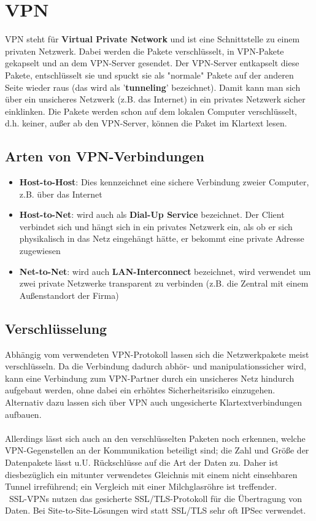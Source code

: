 \chapter{VPN}

VPN steht für \textbf{Virtual Private Network} und ist eine Schnittstelle zu einem privaten Netzwerk. Dabei werden die Pakete verschlüsselt, in VPN-Pakete gekapselt und an dem VPN-Server gesendet. Der VPN-Server entkapselt diese Pakete, entschlüsselt sie und spuckt sie als "normale" Pakete auf der anderen Seite wieder raus (das wird als '\textbf{tunneling}' bezeichnet). Damit kann man sich über ein unsicheres Netzwerk (z.B. das Internet) in ein privates Netzwerk sicher einklinken. Die Pakete werden schon auf dem lokalen Computer verschlüsselt, d.h. keiner, außer ab den VPN-Server, können die Paket im Klartext lesen.

\section{Arten von VPN-Verbindungen}

\begin{itemize}
\item \textbf{Host-to-Host}: Dies kennzeichnet eine sichere Verbindung zweier Computer, z.B. über das Internet
\item \textbf{Host-to-Net}: wird auch als \textbf{Dial-Up Service} bezeichnet. Der Client verbindet sich und hängt sich in ein privates Netzwerk ein, als ob er sich physikalisch in das Netz eingehängt hätte, er bekommt eine private Adresse zugewiesen
\item \textbf{Net-to-Net}: wird auch \textbf{LAN-Interconnect} bezeichnet, wird verwendet um zwei private Netzwerke transparent zu verbinden (z.B. die Zentral mit einem Außenstandort der Firma)
\end{itemize}

\section{Verschlüsselung}

Abhängig vom verwendeten VPN-Protokoll lassen sich die Netzwerkpakete meist verschlüsseln. Da die Verbindung dadurch abhör- und manipulationssicher wird, kann eine Verbindung zum VPN-Partner durch ein unsicheres Netz hindurch aufgebaut werden, ohne dabei ein erhöhtes Sicherheitsrisiko einzugehen. Alternativ dazu lassen sich über VPN auch ungesicherte Klartextverbindungen aufbauen.\\\\
Allerdings lässt sich auch an den verschlüsselten Paketen noch erkennen, welche VPN-Gegenstellen an der Kommunikation beteiligt sind; die Zahl und Größe der Datenpakete lässt u.U. Rückschlüsse auf die Art der Daten zu. Daher ist diesbezüglich ein mitunter verwendetes Gleichnis mit einem nicht einsehbaren Tunnel irreführend; ein Vergleich mit einer Milchglasröhre ist treffender.\\\
SSL-VPNs nutzen das gesicherte SSL/TLS-Protokoll für die Übertragung von Daten. Bei Site-to-Site-Lösungen wird statt SSL/TLS sehr oft IPSec verwendet.

